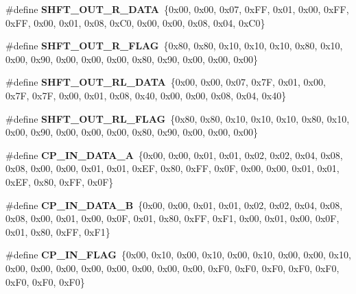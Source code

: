 \begin{DoxyCompactItemize}
\item 
\mbox{\label{unit-test-cpu-dispatch_8c_a5e1a2fe2b7ffee34dad5286708d85fbf}} 
\#define {\bfseries S\+H\+F\+T\+\_\+\+O\+U\+T\+\_\+\+R\+\_\+\+D\+A\+TA}~\{0x00, 0x00, 0x07, 0x\+F\+F, 0x01, 0x00, 0x\+F\+F, 0x\+F\+F, 0x00, 0x01, 0x08, 0x\+C0, 0x00, 0x00, 0x08, 0x04, 0x\+C0\}
\item 
\mbox{\label{unit-test-cpu-dispatch_8c_a4dc30257b036e8f158ed0ecad472f139}} 
\#define {\bfseries S\+H\+F\+T\+\_\+\+O\+U\+T\+\_\+\+R\+\_\+\+F\+L\+AG}~\{0x80, 0x80, 0x10, 0x10, 0x10, 0x80, 0x10, 0x00, 0x90, 0x00, 0x00, 0x00, 0x80, 0x90, 0x00, 0x00, 0x00\}
\item 
\mbox{\label{unit-test-cpu-dispatch_8c_ae1fc842fce3111f908998f2a12b4f417}} 
\#define {\bfseries S\+H\+F\+T\+\_\+\+O\+U\+T\+\_\+\+R\+L\+\_\+\+D\+A\+TA}~\{0x00, 0x00, 0x07, 0x7\+F, 0x01, 0x00, 0x7\+F, 0x7\+F, 0x00, 0x01, 0x08, 0x40, 0x00, 0x00, 0x08, 0x04, 0x40\}
\item 
\mbox{\label{unit-test-cpu-dispatch_8c_a7e50dfdeb9d1faa8476f5fe38c58c741}} 
\#define {\bfseries S\+H\+F\+T\+\_\+\+O\+U\+T\+\_\+\+R\+L\+\_\+\+F\+L\+AG}~\{0x80, 0x80, 0x10, 0x10, 0x10, 0x80, 0x10, 0x00, 0x90, 0x00, 0x00, 0x00, 0x80, 0x90, 0x00, 0x00, 0x00\}
\item 
\mbox{\label{unit-test-cpu-dispatch_8c_a228c5b1e2ffacf71990674634ac5a14d}} 
\#define {\bfseries C\+P\+\_\+\+I\+N\+\_\+\+D\+A\+T\+A\+\_\+A}~\{0x00, 0x00, 0x01, 0x01, 0x02, 0x02, 0x04, 0x08, 0x08, 0x00, 0x00, 0x01, 0x01, 0x\+E\+F, 0x80, 0x\+F\+F, 0x0\+F, 0x00, 0x00, 0x01, 0x01, 0x\+E\+F, 0x80, 0x\+F\+F, 0x0\+F\}
\item 
\mbox{\label{unit-test-cpu-dispatch_8c_ae82cbc7d5faecda24999518d325b0b0f}} 
\#define {\bfseries C\+P\+\_\+\+I\+N\+\_\+\+D\+A\+T\+A\+\_\+B}~\{0x00, 0x00, 0x01, 0x01, 0x02, 0x02, 0x04, 0x08, 0x08, 0x00, 0x01, 0x00, 0x0\+F, 0x01, 0x80, 0x\+F\+F, 0x\+F1, 0x00, 0x01, 0x00, 0x0\+F, 0x01, 0x80, 0x\+F\+F, 0x\+F1\}
\item 
\mbox{\label{unit-test-cpu-dispatch_8c_af00857cd1fb8ffc91b222c458cd961f2}} 
\#define {\bfseries C\+P\+\_\+\+I\+N\+\_\+\+F\+L\+AG}~\{0x00, 0x10, 0x00, 0x10, 0x00, 0x10, 0x00, 0x00, 0x10, 0x00, 0x00, 0x00, 0x00, 0x00, 0x00, 0x00, 0x00, 0x\+F0, 0x\+F0, 0x\+F0, 0x\+F0, 0x\+F0, 0x\+F0, 0x\+F0, 0x\+F0\}

\end{DoxyCompactItemize}
